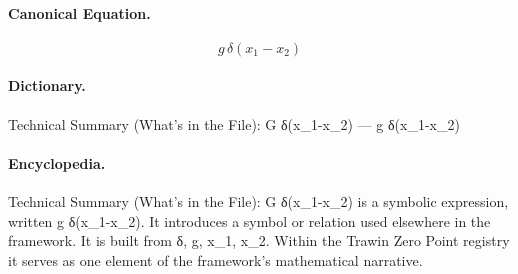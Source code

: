 \paragraph{Canonical Equation.}
\[
g\,\delta(x_1-x_2)
\]

\paragraph{Dictionary.}
Technical Summary (What’s in the File): G δ(x\_1-x\_2) — g δ(x\_1-x\_2)

\paragraph{Encyclopedia.}
Technical Summary (What’s in the File): G δ(x\_1-x\_2) is a symbolic expression, written g δ(x\_1-x\_2). It introduces a symbol or relation used elsewhere in the framework. It is built from δ, g, x\_1, x\_2. Within the Trawin Zero Point registry it serves as one element of the framework's mathematical narrative.
